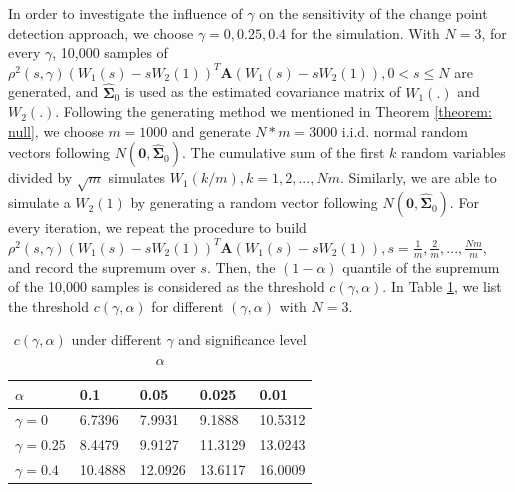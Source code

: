 \documentclass{article}
\theoremstyle{definition}
\begin{document}
In order to investigate the influence of $\gamma$ on the sensitivity of the change point detection approach, we choose $\gamma = 0, 0.25, 0.4$ for the simulation. With $N = 3$, for every $\gamma$, 10,000 samples of $\rho^2(s,\gamma)(W_1(s)-sW_2(1))^T\bm{A}(W_1(s)-sW_2(1)), 0<s\leq N$ are generated, and $\hat{\bm{\Sigma}}_0$ is used as the estimated covariance matrix of $W_1(.)$ and $W_2(.)$. Following the generating method we mentioned in Theorem \ref{theorem: null}, we choose $m = 1000$ and generate $N*m = 3000$ i.i.d. normal random vectors following $N(\bm{0}, \hat{\bm{\Sigma}}_0)$. 
The cumulative sum of the first $k$ random variables divided by $\sqrt{m}$ simulates $W_1(k/m), k = 1,2,...,Nm.$  Similarly, we are able to simulate a $W_2(1)$ by generating a random vector following $N(\bm{0}, \hat{\bm{\Sigma}}_0)$. For every iteration, we repeat the procedure to build $\rho^2(s, \gamma)(W_1(s)-sW_2(1))^T\bm{A}(W_1(s)-sW_2(1)), s = \frac{1}{m}, \frac{2}{m},...,\frac{Nm}{m}$, and record the supremum over $s$. Then, the $(1-\alpha)$ quantile of the supremum of the 10,000 samples is considered as the threshold $c(\gamma, \alpha)$.
In Table \ref{table:null c }, we list the threshold $c(\gamma,\alpha)$ for different $(\gamma,\alpha)$ with $N = 3$.
\begin{table}[!htb]
\centering
\begin{tabular}{lllll}
\hline
$\alpha$        & 0.1    & 0.05   & 0.025  & 0.01    \\ \hline
$\gamma = 0$    & 6.7396 & 7.9931 & 9.1888 & 10.5312  \\
$\gamma = 0.25$ & 8.4479 & 9.9127 & 11.3129 & 13.0243  \\
$\gamma = 0.4$  & 10.4888 & 12.0926 & 13.6117 & 16.0009 \\ \hline
\end{tabular}
\caption{$c(\gamma,\alpha)$ under different $\gamma$ and significance level $\alpha$}\label{table:null c }
\end{table}
\end{document}
